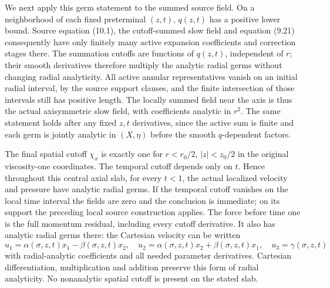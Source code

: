 We next apply this germ statement to the summed source field.
On a neighborhood of each fixed preterminal $(z,t)$, $q(z,t)$
has a positive lower bound. Source equation (10.1), the
cutoff-summed slow field and equation (9.21) consequently have
only finitely many active expansion coefficients and correction
stages there. The summation cutoffs are functions of $q(z,t)$,
independent of $r$; their smooth derivatives therefore multiply
the analytic radial germs without changing radial analyticity.
All active annular representatives vanish on an initial radial
interval, by the source support clauses, and the finite
intersection of those intervals still has positive length.
The locally summed field near the axis is thus the actual
axisymmetric slow field, with coefficients analytic in $r^2$.
The same statement holds after any fixed $z,t$ derivatives,
since the active sum is finite and each germ is jointly analytic
in $(X,\eta)$ before the smooth $q$-dependent factors.

The final spatial cutoff $\chi_x$ is exactly one for
$r<r_0/2$, $|z|<z_0/2$ in the original viscosity-one coordinates.
The temporal cutoff depends only on $t$. Hence throughout this
central axial slab, for every $t<1$, the actual localized
velocity and pressure have analytic radial germs. If the
temporal cutoff vanishes on the local time interval the fields
are zero and the conclusion is immediate; on its support the
preceding local source construction applies. The force before
time one is the full momentum residual, including every cutoff
derivative. It also has analytic radial germs there: the
Cartesian velocity can be written
\[
 u_1=\alpha(\sigma,z,t)x_1-\beta(\sigma,z,t)x_2,\quad
 u_2=\alpha(\sigma,z,t)x_2+\beta(\sigma,z,t)x_1,\quad
 u_3=\gamma(\sigma,z,t)
\]
with radial-analytic coefficients and all needed parameter
derivatives. Cartesian differentiation, multiplication and
addition preserve this form of radial analyticity. No
nonanalytic spatial cutoff is present on the stated slab.

